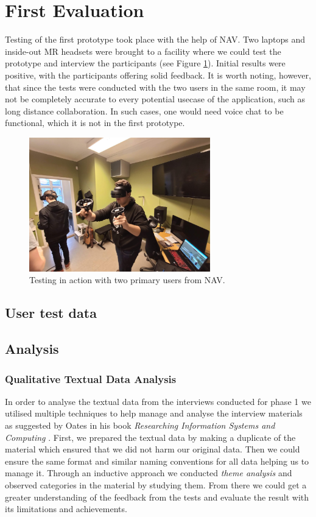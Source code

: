 \section{First Evaluation}
Testing of the first prototype took place with the help of NAV. Two laptops and inside-out MR headsets were brought to a facility where we could test the prototype and interview the participants (see Figure \ref{fig:testingPhase1}). Initial results were positive, with the participants offering solid feedback. It is worth noting, however, that since the tests were conducted with the two users in the same room, it may not be completely accurate to every potential usecase of the application, such as long distance collaboration. In such cases, one would need voice chat to be functional, which it is not in the first prototype.

\begin{figure}[H]
  \centering
    \includegraphics[width=0.7\textwidth]{fig/phase_1/testingPhase1.jpg}
 \caption{Testing in action with two primary users from NAV.}
\label{fig:testingPhase1}
\end{figure}


\subsection{User test data}

\subsection{Analysis}
\subsubsection{Qualitative Textual Data Analysis}
In order to analyse the textual data from the interviews conducted for phase 1 we utilised multiple techniques to help manage and analyse the interview materials as suggested by Oates in his book \textit{Researching Information Systems and Computing } \cite{oates2005researching}. First, we prepared the textual data by making a duplicate of the material which ensured that we did not harm our original data. Then we could ensure the same format and similar naming conventions for all data helping us to manage it. Through an inductive approach \cite{oates2005researching} we conducted \textit{theme analysis} and observed categories in the material by studying them. From there we could get a greater understanding of the feedback from the tests and evaluate the result with its limitations and achievements.

